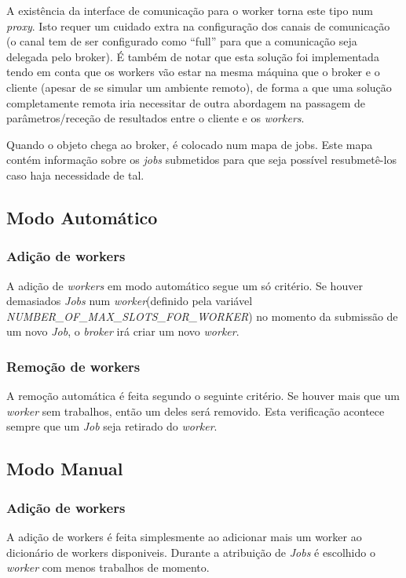 \documentclass[a4paper]{article}
\begin{document}
A existência da interface de comunicação para o worker torna este tipo num \emph{proxy}. Isto requer um cuidado extra na configuração dos canais de comunicação (o canal tem de ser configurado como "`full"' para que a comunicação seja delegada pelo broker). É também de notar que esta solução foi implementada tendo em conta que os workers vão estar na mesma máquina que o broker e o cliente (apesar de se simular um ambiente remoto), de forma a que uma solução completamente remota iria necessitar de outra abordagem na passagem de parâmetros/receção de resultados entre o cliente e os \emph{workers}.

Quando o objeto chega ao broker, é colocado num mapa de jobs. Este mapa contém informação sobre os \emph{jobs} submetidos para que seja possível resubmetê-los caso haja necessidade de tal.

\subsection{Modo Automático}
\subsubsection{Adição de workers}
A adição de \emph{workers} em modo automático segue um só critério. Se houver demasiados \emph{Jobs} num \emph{worker}(definido pela variável \emph{NUMBER\_OF\_MAX\_SLOTS\_FOR\_WORKER}) no momento da submissão de um novo \emph{Job}, o \emph{broker} irá criar um novo \emph{worker}.

\subsubsection{Remoção de workers}
A remoção automática é feita segundo o seguinte critério. Se houver mais que um \emph{worker } sem trabalhos, então um deles será removido. Esta verificação acontece sempre que um \emph{Job} seja retirado do \emph{worker}.

\subsection{Modo Manual}
\subsubsection{Adição de workers}
A adição de workers é feita simplesmente ao adicionar mais um worker ao dicionário de workers disponiveis. Durante a atribuição de \emph{Jobs} é escolhido o \emph{worker} com menos trabalhos de momento.
\end{document}
